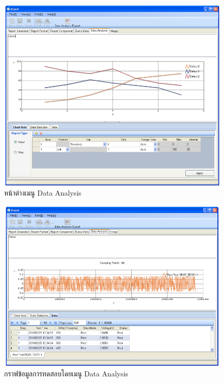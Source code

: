 \begin{center}
	\begin{figure}[H]
		\includegraphics[width=1\linewidth]{Chapters/img/17020_Program/Report/Data_analysis.png}
		\centering
		\captionsetup{justification=centering,margin=2cm}
		\caption{หน้าต่างเมนู Data Analysis}
		\label{fig:Data_analysis}
	\end{figure}
	\begin{figure}[H]
		\includegraphics[width=1\linewidth]{Chapters/img/17020_Program/Report/Data_analysis_preview.png}
		\centering
		\captionsetup{justification=centering,margin=2cm}
		\caption{กราฟข้อมูลการทดสอบโดยเมนู Data Analysis}

\end{figure}
\end{center}
